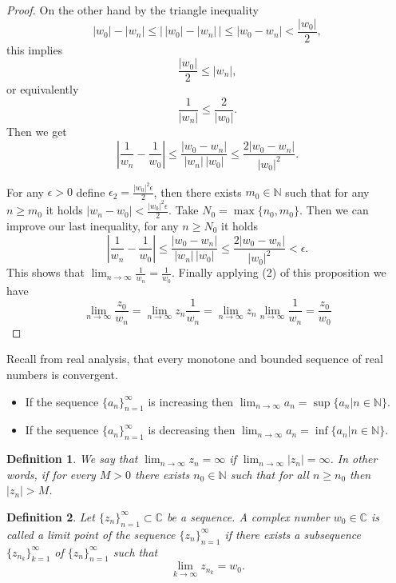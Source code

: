 \documentclass{amsart}
\newtheorem{mydef}{Definition}
\begin{document}
\begin{proof}
On the other hand by the triangle inequality
\[ |w_0| - |w_n| \leq \left|\, |w_0| - |w_n|\, \right| \leq |w_0 - w_n | < \frac{|w_0|}{2}, \]
this implies
\[ \frac{|w_0|}{2} \leq |w_n|, \]
or equivalently
\[ \frac{1}{|w_n|} \leq \frac{2}{|w_0|}. \]
Then we get
\[ \left| \frac{1}{w_n} - \frac{1}{w_0} \right| \leq \frac{ |w_0 - w_n|}{|w_n |\, |w_0|} \leq \frac{2 |w_0 - w_n|}{ |w_0|^2}. \]

For any \(\epsilon >0\) define \(\epsilon_2 = \frac{|w_0|^2\epsilon}{2}\), then there exists \(m_0 \in \mathbb{N}\) such that for any \(n\geq m_0\) it holds \(|w_n - w_0| < \frac{|w_0|^2\epsilon}{2}\).
Take \(N_0 = \max\{n_0, m_0\}\). Then we can improve our last inequality, for any \(n \geq N_0\) it holds
\[ \left| \frac{1}{w_n} - \frac{1}{w_0} \right| \leq \frac{ |w_0 - w_n|}{|w_n |\, |w_0|} \leq \frac{2 |w_0 - w_n|}{ |w_0|^2} < \epsilon. \]
This shows that  \(\displaystyle\lim_{n\to\infty}\frac{1}{w_n} = \frac{1}{w_0}\).
Finally applying (2) of this proposition we have
\[ \displaystyle\lim_{n\to\infty}\frac{z_0}{w_n} = \lim_{n\to\infty} z_n\frac{1}{w_n} = \lim_{n\to\infty} z_n \lim_{n\to\infty}\frac{1}{w_n} = \frac{z_0}{w_0} \]
\end{proof}

Recall from real analysis, that every monotone and bounded sequence of real numbers is convergent.
\begin{itemize}
\item If the sequence \(\{a_n\}_{n=1}^{\infty}\) is increasing then \(\lim_{n\to\infty} a_n = \sup\{a_n| n\in \mathbb{N}\}\).
\item If the sequence \(\{a_n\}_{n=1}^{\infty}\) is decreasing then \(\lim_{n\to\infty} a_n = \inf\{a_n| n\in \mathbb{N}\}\).
\end{itemize}


\begin{mydef}
We say that \(\lim_{n\to\infty} z_n = \infty\) if \(\lim_{n\to \infty}|z_n| = \infty\). In other words,
if for every \(M>0\) there exists \(n_0\in\mathbb{N}\) such that for all \(n\geq n_0\) then \(|z_n| > M\).
\end{mydef}


\begin{mydef}
Let \(\{z_n\}_{n=1}^{\infty} \subset \mathbb{C}\) be a sequence. A complex number \(w_0\in\mathbb{C}\) is 
called a limit point of the sequence \(\{z_n\}_{n=1}^{\infty}\) if there exists a subsequence
\(\{z_{n_k}\}_{k=1}^{\infty}\) of \(\{z_n\}_{n=1}^{\infty}\) such that
\[ \lim_{k\to\infty}z_{n_k} = w_0. \]
\end{mydef}
\end{document}
